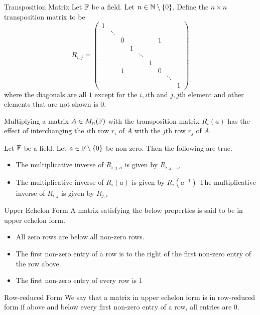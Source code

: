 \documentclass[a4paper]{article}
\begin{document}
\begin{defn}{Transposition Matrix}{} Let $\mathbb{F}$ be a field. Let $n\in\mathbb{N}\setminus\{0\}$. Define the $n\times n$ transposition matrix to be $$R_{i,j}=
\begin{pmatrix}
1&&&&&&&&\\
&\ddots&&&&&&&\\
&&0&&&&1&&\\
&&&1&&&&&\\
&&&&\ddots&&&&\\
&&&&&1&&&\\
&&1&&&&0&&\\
&&&&&&&\ddots&\\
&&&&&&&&1
\end{pmatrix}$$ where the diagonals are all $1$ except for the $i,i$th and $j,j$th element and other elements that are not shown is $0$.
\end{defn}

Multiplying a matrix $A\in M_n(\mathbb{F})$ with the transposition matrix $R_i(a)$ has the effect of interchanging the $i$th row $r_i$ of $A$ with the $j$th row $r_j$ of $A$. 

\begin{prp}{}{} Let $\mathbb{F}$ be a field. Let $a\in\mathbb{F}\setminus\{0\}$ be non-zero. Then the following are true. 
\begin{itemize}
\item The multiplicative inverse of $R_{i,j,a}$ is given by $R_{i,j,-a}$
\item The multiplicative inverse of $R_i(a)$ is given by $R_i(a^{-1})$
The multiplicative inverse of $R_{i,j}$ is given by $R_{j,i}$
\end{itemize}
\end{prp}

\begin{defn}{Upper Echelon Form}{} A matrix satisfying the below properties is said to be in upper echelon form. 
\begin{itemize}
\item All zero rows are below all non-zero rows. 
\item The first non-zero entry of a row is to the right of the first non-zero entry of the row above. 
\item The first non-zero entry of every row is $1$
\end{itemize}
\end{defn}

\begin{defn}{Row-reduced Form}{} We say that a matrix in upper echelon form is in row-reduced form if above and below every first non-zero entry of a row, all entries are $0$. 
\end{defn}
\end{document}
